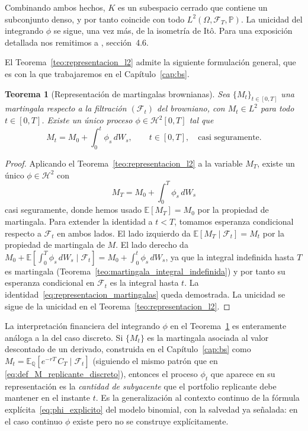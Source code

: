 \documentclass[11pt,a4paper,oneside]{report}
\theoremstyle{plain}
\newtheorem{teorema}{Teorema}[chapter]
\theoremstyle{definition}
\theoremstyle{remark}
\newcommand{\E}{\mathbb{E}}
\newcommand{\PP}{\mathbb{P}}
\newcommand{\Q}{\mathbb{Q}}
\newcommand{\F}{\mathcal{F}}
\newcommand{\1}{\mathbf{1}}
\begin{document}
Combinando ambos hechos, $K$ es un subespacio cerrado que contiene
un subconjunto denso, y por tanto coincide con todo $L^2(\Omega,
\F_T, \PP)$. La unicidad del integrando $\phi$ se sigue, una vez
más, de la isometría de It\^o. Para una exposición detallada nos
remitimos a \cite{etheridge}, sección~4.6.

El
Teorema~\ref{teo:representacion_l2} admite la siguiente formulación
general, que es con la que trabajaremos en el
Capítulo~\ref{cap:bs}.

\begin{teorema}[Representación de martingalas brownianas]
\label{teo:representacion_martingalas}
Sea $\{M_t\}_{t \in [0, T]}$ una martingala respecto a la filtración $(\F_t)$ del browniano, con $M_t \in L^2$ para todo $t \in [0,
T]$. Existe un único proceso $\phi \in \mathcal{H}^2[0, T]$ tal que
\begin{equation}\label{eq:representacion_martingalas}
  M_t = M_0 + \int_0^t \phi_s\, dW_s,
  \qquad t \in [0, T],
  \quad \text{casi seguramente}.
\end{equation}
\end{teorema}

\begin{proof}
Aplicando el Teorema~\ref{teo:representacion_l2} a la variable
$M_T$, existe un único $\phi \in \mathcal{H}^2$ con
\begin{equation*}
  M_T = M_0 + \int_0^T \phi_s\, dW_s
\end{equation*}
casi seguramente, donde hemos usado $\E[M_T] = M_0$ por la propiedad
de martingala. Para extender la identidad a $t < T$, tomamos
esperanza condicional respecto a $\F_t$ en ambos lados. El lado
izquierdo da $\E[M_T \mid \F_t] = M_t$ por la propiedad de martingala
de $M$. El lado derecho da $M_0 + \E[\int_0^T \phi_s\, dW_s \mid \F_t]
= M_0 + \int_0^t \phi_s\, dW_s$, ya que la integral indefinida hasta
$T$ es martingala (Teorema~\ref{teo:martingala_integral_indefinida}) y
por tanto su esperanza condicional en $\F_t$ es la integral hasta
$t$. La identidad~\eqref{eq:representacion_martingalas} queda
demostrada. La unicidad se sigue de la unicidad en el
Teorema~\ref{teo:representacion_l2}.
\end{proof}

La interpretación
financiera del integrando $\phi$ en el
Teorema~\ref{teo:representacion_martingalas} es enteramente análoga a
la del caso discreto. Si $\{M_t\}$ es la martingala asociada al valor
descontado de un derivado, construida en el Capítulo~\ref{cap:bs} como
$M_t = \E_\Q[e^{-rT}\, C_T \mid \F_t]$ (siguiendo el mismo patrón que en \eqref{eq:def_M_replicante_discreto}), entonces el proceso $\phi_t$
que aparece en su representación es la \emph{cantidad de subyacente}
que el portfolio replicante debe mantener en el instante $t$. Es la
generalización al contexto continuo de la fórmula
explícita~\eqref{eq:phi_explicito} del modelo binomial, con la salvedad
ya señalada: en el caso continuo $\phi$ existe pero no se construye
explícitamente.
\end{document}
